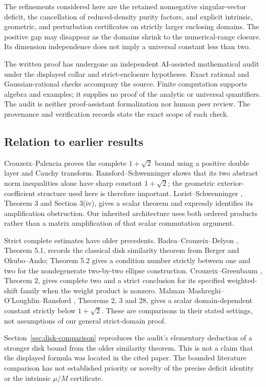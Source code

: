 \documentclass[11pt]{article}
\theoremstyle{remark}\newtheorem{remark}[theorem]{Remark}
\begin{document}
The refinements considered here are the retained nonnegative singular-vector deficit, the cancellation of reduced-density purity factors, and explicit intrinsic, geometric, and perturbation certificates on strictly larger enclosing domains. The positive gap may disappear as the domains shrink to the numerical-range closure. Its dimension independence does not imply a universal constant less than two.

The written proof has undergone an independent AI-assisted mathematical audit under the displayed collar and strict-enclosure hypotheses. Exact rational and Gaussian-rational checks accompany the source. Finite computation supports algebra and examples; it supplies no proof of the analytic or universal quantifiers. The audit is neither proof-assistant formalization nor human peer review. The provenance and verification records state the exact scope of each check.

\subsection{Relation to earlier results}
Crouzeix--Palencia \cite{CP} proves the complete $1+\sqrt2$ bound using a positive double layer and Cauchy transform. Ransford--Schwenninger \cite{RS} shows that its two abstract norm inequalities alone have sharp constant $1+\sqrt2$; the geometric exterior-coefficient structure used here is therefore important. Lorist--Schwenninger \cite{LS}, Theorem 3 and Section 3(iv), gives a scalar theorem and expressly identifies its amplification obstruction. Our inherited architecture uses both ordered products rather than a matrix amplification of that scalar commutation argument.

Strict complete estimates have older precedents. Badea--Crouzeix--Delyon \cite{BCD}, Theorem 5.1, records the classical disk similarity theorem from Berger and Okubo--Ando; Theorem 5.2 gives a condition number strictly between one and two for the nondegenerate two-by-two ellipse construction. Crouzeix--Greenbaum \cite{CG}, Theorem 2, gives complete two and a strict conclusion for its specified weighted-shift family when the weight product is nonzero. Malman--Mashreghi--O'Loughlin--Ransford \cite{MMOR}, Theorems 2, 3 and 28, gives a scalar domain-dependent constant strictly below $1+\sqrt2$. These are comparisons in their stated settings, not assumptions of our general strict-domain proof.

Section~\ref{sec:disk-comparison} reproduces the audit's elementary deduction of a stronger disk bound from the older similarity theorem. This is not a claim that the displayed formula was located in the cited paper. The bounded literature comparison has not established priority or novelty of the precise deficit identity or the intrinsic $\mu/M$ certificate.
\end{document}
